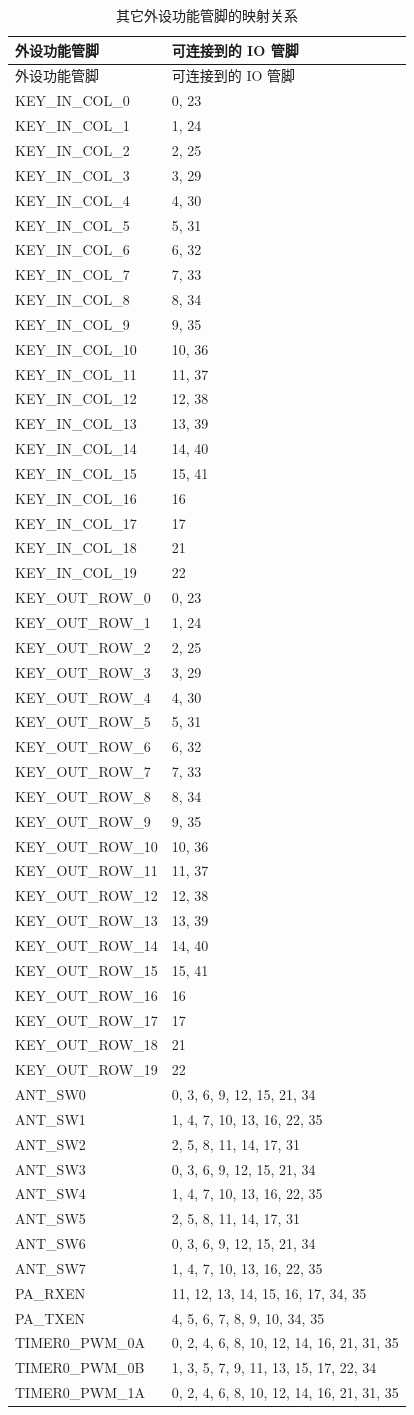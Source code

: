 \documentclass[
  12pt,
]{book}
\begin{document}
\begin{longtable}[]{@{}ll@{}}
\caption{\label{tab:ch-pinctrl-mapping} 其它外设功能管脚的映射关系}\tabularnewline
\toprule
外设功能管脚 & 可连接到的 IO 管脚\tabularnewline
\midrule
\endfirsthead
\toprule
外设功能管脚 & 可连接到的 IO 管脚\tabularnewline
\midrule
\endhead
KEY\_IN\_COL\_0 & 0, 23\tabularnewline
KEY\_IN\_COL\_1 & 1, 24\tabularnewline
KEY\_IN\_COL\_2 & 2, 25\tabularnewline
KEY\_IN\_COL\_3 & 3, 29\tabularnewline
KEY\_IN\_COL\_4 & 4, 30\tabularnewline
KEY\_IN\_COL\_5 & 5, 31\tabularnewline
KEY\_IN\_COL\_6 & 6, 32\tabularnewline
KEY\_IN\_COL\_7 & 7, 33\tabularnewline
KEY\_IN\_COL\_8 & 8, 34\tabularnewline
KEY\_IN\_COL\_9 & 9, 35\tabularnewline
KEY\_IN\_COL\_10 & 10, 36\tabularnewline
KEY\_IN\_COL\_11 & 11, 37\tabularnewline
KEY\_IN\_COL\_12 & 12, 38\tabularnewline
KEY\_IN\_COL\_13 & 13, 39\tabularnewline
KEY\_IN\_COL\_14 & 14, 40\tabularnewline
KEY\_IN\_COL\_15 & 15, 41\tabularnewline
KEY\_IN\_COL\_16 & 16\tabularnewline
KEY\_IN\_COL\_17 & 17\tabularnewline
KEY\_IN\_COL\_18 & 21\tabularnewline
KEY\_IN\_COL\_19 & 22\tabularnewline
KEY\_OUT\_ROW\_0 & 0, 23\tabularnewline
KEY\_OUT\_ROW\_1 & 1, 24\tabularnewline
KEY\_OUT\_ROW\_2 & 2, 25\tabularnewline
KEY\_OUT\_ROW\_3 & 3, 29\tabularnewline
KEY\_OUT\_ROW\_4 & 4, 30\tabularnewline
KEY\_OUT\_ROW\_5 & 5, 31\tabularnewline
KEY\_OUT\_ROW\_6 & 6, 32\tabularnewline
KEY\_OUT\_ROW\_7 & 7, 33\tabularnewline
KEY\_OUT\_ROW\_8 & 8, 34\tabularnewline
KEY\_OUT\_ROW\_9 & 9, 35\tabularnewline
KEY\_OUT\_ROW\_10 & 10, 36\tabularnewline
KEY\_OUT\_ROW\_11 & 11, 37\tabularnewline
KEY\_OUT\_ROW\_12 & 12, 38\tabularnewline
KEY\_OUT\_ROW\_13 & 13, 39\tabularnewline
KEY\_OUT\_ROW\_14 & 14, 40\tabularnewline
KEY\_OUT\_ROW\_15 & 15, 41\tabularnewline
KEY\_OUT\_ROW\_16 & 16\tabularnewline
KEY\_OUT\_ROW\_17 & 17\tabularnewline
KEY\_OUT\_ROW\_18 & 21\tabularnewline
KEY\_OUT\_ROW\_19 & 22\tabularnewline
ANT\_SW0 & 0, 3, 6, 9, 12, 15, 21, 34\tabularnewline
ANT\_SW1 & 1, 4, 7, 10, 13, 16, 22, 35\tabularnewline
ANT\_SW2 & 2, 5, 8, 11, 14, 17, 31\tabularnewline
ANT\_SW3 & 0, 3, 6, 9, 12, 15, 21, 34\tabularnewline
ANT\_SW4 & 1, 4, 7, 10, 13, 16, 22, 35\tabularnewline
ANT\_SW5 & 2, 5, 8, 11, 14, 17, 31\tabularnewline
ANT\_SW6 & 0, 3, 6, 9, 12, 15, 21, 34\tabularnewline
ANT\_SW7 & 1, 4, 7, 10, 13, 16, 22, 35\tabularnewline
PA\_RXEN & 11, 12, 13, 14, 15, 16, 17, 34, 35\tabularnewline
PA\_TXEN & 4, 5, 6, 7, 8, 9, 10, 34, 35\tabularnewline
TIMER0\_PWM\_0A & 0, 2, 4, 6, 8, 10, 12, 14, 16, 21, 31, 35\tabularnewline
TIMER0\_PWM\_0B & 1, 3, 5, 7, 9, 11, 13, 15, 17, 22, 34\tabularnewline
TIMER0\_PWM\_1A & 0, 2, 4, 6, 8, 10, 12, 14, 16, 21, 31, 35\tabularnewline

\end{longtable}
\end{document}

